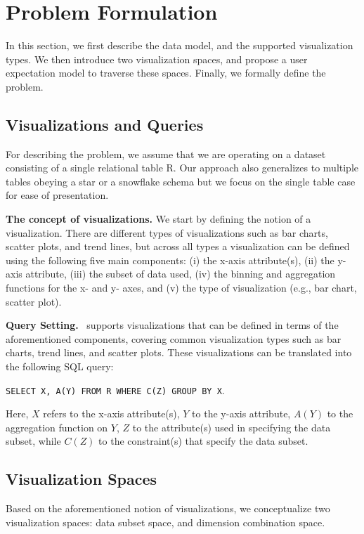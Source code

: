 \section{Problem Formulation} 
In this section, we first describe the data model, and the supported visualization types. We then introduce two visualization spaces, and propose a user expectation model to traverse these spaces. Finally, we formally define the problem.

\subsection{Visualizations and Queries}
For describing the problem, we assume that we are operating on a dataset consisting of a single relational table R. Our approach also generalizes to multiple tables obeying a star or a snowflake schema but we focus on the single table case for ease of presentation. 

\textbf{The concept of visualizations.}  We start by defining the notion of a visualization. There are different types of visualizations such as bar charts, scatter plots, and trend lines, but across all types a visualization can be defined using the following five main components: (i) the x-axis attribute(s), (ii) the y-axis attribute, (iii) the subset of data used, (iv) the binning and aggregation functions for the x- and y- axes, and (v) the type of visualization (e.g., bar chart, scatter plot).


\textbf{Query Setting.} \system\ supports visualizations that can be defined in terms of the aforementioned components, covering common visualization types such as bar charts, trend lines, and scatter plots. These visualizations can be translated into the following \textsc{SQL} query: 

\begin{center}
{\tt SELECT X, A(Y) FROM R WHERE C(Z) GROUP BY X}.
\end{center}

Here, $X$ refers to the x-axis attribute(s), $Y$ to the y-axis attribute, $A(Y)$ to the aggregation function on $Y$, $Z$ to the attribute(s) used in specifying the data subset, while $C(Z)$ to the constraint(s) that specify the data subset.

\subsection{Visualization Spaces}
Based on the aforementioned notion of visualizations, we conceptualize two visualization spaces: data subset space, and dimension combination space.

